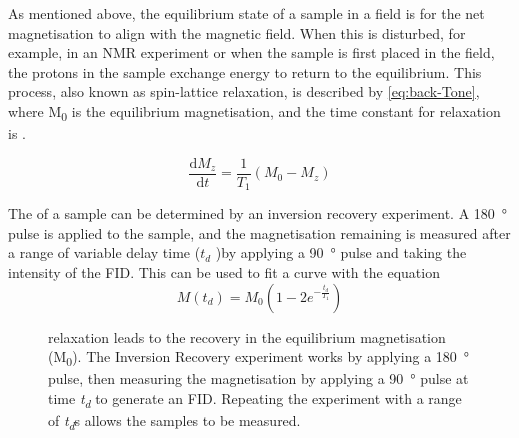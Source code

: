 As mentioned above, the equilibrium state of a sample in a \Bzero field is for the net magnetisation to align with the \Bzero magnetic field.
When this is disturbed, for example, in an NMR experiment or when the sample is first placed in the \Bzero field, the protons in the sample exchange energy to return to the equilibrium.
This process, also known as spin-lattice relaxation, is described by \autoref{eq:back-Tone}, where M\textsubscript{0} is the equilibrium magnetisation, and the time constant for relaxation is \Tone.

\begin{equation}
\frac{\mathrm{d} M_z}{\mathrm{d} t} = \frac{1}{T_1} (M_0-M_z)
\label{eq:back-Tone}
\end{equation}

The \Tone of a sample can be determined by an inversion recovery experiment.
A \SI{180}{\degree} pulse is applied to the sample, and the magnetisation remaining is measured after a range of variable delay time ($t_d$ )by applying a \SI{90}{\degree} pulse and taking the intensity of the FID.
This can be used to fit a curve with the equation
\begin{displaymath}
M(t_d) = M_0 (1 - 2 e^{-\frac{t_d}{T_1}})
\end{displaymath}

\begin{figure}[t]
\centering
{}
\caption[Inversion recovery experiment]{\Tone relaxation leads to the recovery in the equilibrium magnetisation (M\textsubscript{0}). The Inversion Recovery experiment works by applying a \SI{180}{\degree} pulse, then measuring the magnetisation by applying a \SI{90}{\degree} pulse at time \textit{t\textsubscript{d}} to generate an FID. Repeating the experiment with a range of \textit{t\textsubscript{d}}s allows the samples \Tone to be measured.}
\label{fig:back-T1}
\end{figure}

